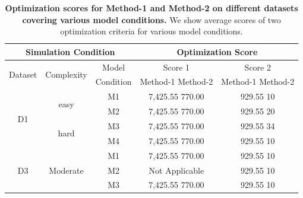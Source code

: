 \documentclass[12pt, a4paper]{article} %
\begin{document}
	\begin{table}[h]
		\centering
		\caption{\textbf{Optimization scores for Method-1 and Method-2 on different datasets covering various model conditions.} We show average scores of two optimization criteria for various model conditions.}
		
	\vspace{10mm}
	\begin{tabular}{|c|c|c|c|c|c|c|}
	\hline
	\multicolumn{3}{|c|}{Simulation Condition} & \multicolumn{4}{|c|}{Optimization Score}\\ 
	\hline
	\multirow{2}{*}{Dataset} & \multirow{2}{*}{Complexity} & Model & \multicolumn{2}{|c|}{Score 1} & \multicolumn{2}{|c|}{Score 2}\\ 
	\cline{4-7}
	& &	Condition & \multicolumn{2}{|c|}{Method-1 \hspace{5mm} Method-2} & \multicolumn{2}{|c|}{Method-1 \hspace{5mm} Method-2} \\ \hline
	\hline
	
	\multirow{4}{*}{D1} & \multirow{2}{*}{easy} & M1 & \multicolumn{2}{c}{7,425.55 \hspace{10mm}     770.00} & \multicolumn{2}{|c|}{929.55 \hspace{10mm} 10} \\
	& & M2 & \multicolumn{2}{c}{7,425.55 \hspace{10mm}     770.00} & \multicolumn{2}{|c|}{929.55 \hspace{10mm} 20} \\
	\cline{2-7}
	
	 & \multirow{2}{*}{hard} & M3 & \multicolumn{2}{c}{7,425.55 \hspace{10mm} 770.00} & \multicolumn{2}{|c|}{929.55 \hspace{10mm} 34}\\
	& & M4 &\multicolumn{2}{c}{7,425.55 \hspace{10mm} 770.00} & \multicolumn{2}{|c|}{929.55 \hspace{10mm} 10} \\
	\hline
	\hline
	
	\multirow{3}{*}{D3} & \multirow{3}{*}{Moderate} &M1 & \multicolumn{2}{c}{7,425.55 \hspace{10mm}     770.00}& \multicolumn{2}{|c|}{929.55 \hspace{10mm} 10}\\
	
	& & M2 & \multicolumn{2}{c}{Not Applicable} & \multicolumn{2}{|c|}{929.55 \hspace{10mm} 10}\\
	& & M3 &\multicolumn{2}{c}{7,425.55 \hspace{10mm}     770.00} & \multicolumn{2}{|c|}{929.55 \hspace{10mm} 10} \\
	\cline{1-7}	
			
		\end{tabular}
	\end{table}
	\newpage
	
\end{document}
